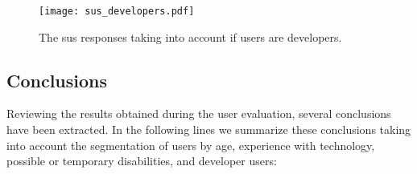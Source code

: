 \begin{figure}
\centering
\texttt{[image: sus\_developers.pdf]}
\caption{The \ac{sus} responses taking into account if users are developers.}
\label{fig:sus_developers}
\end{figure}

\subsection{Conclusions}
\label{sec:user_evaluation_conclusions}

Reviewing the results obtained during the user evaluation, several conclusions 
have been extracted. In the following lines we summarize these conclusions taking 
into account the segmentation of users by age, experience with technology, possible 
or temporary disabilities, and developer users:

